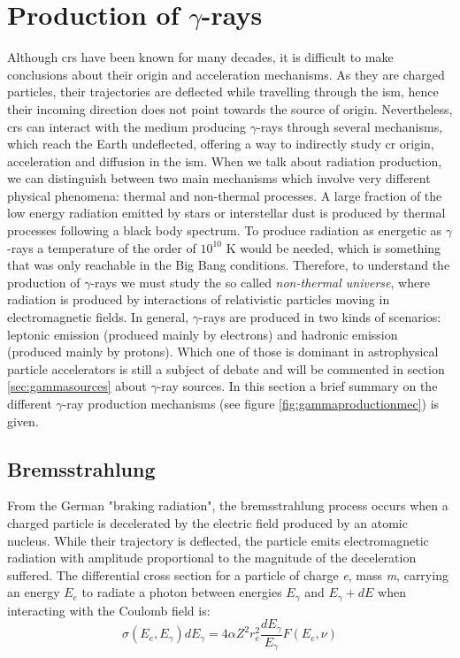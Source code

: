 \documentclass[main.tex]{subfiles}
\begin{document}
\section{Production of $\gamma$-rays}\label{sec:gammaproduction}

Although \glspl{cr} have been known for many decades, it is difficult to make conclusions about their origin and acceleration mechanisms. As they are charged particles, their trajectories are deflected while travelling through the \gls{ism}, hence their incoming direction does not point towards the source of origin. Nevertheless, \glspl{cr} can interact with the medium producing $\gamma$-rays through several mechanisms, which reach the Earth undeflected, offering a way to indirectly study \gls{cr} origin, acceleration and diffusion in the \gls{ism}.  
When we talk about radiation production, we can distinguish between two main mechanisms which involve very different physical phenomena: thermal and non-thermal processes. A large fraction of the low energy radiation emitted by stars or interstellar dust is produced by thermal processes following a black body spectrum. To produce radiation as energetic as $\gamma$-rays a temperature of the order of $10^{10}$ K would be needed, which is something that was only reachable in the Big Bang conditions. Therefore, to understand the production of $\gamma$-rays we must study the so called \textit{non-thermal universe}, where radiation is produced by interactions of relativistic particles moving in electromagnetic fields.
In general, $\gamma$-rays are produced in two kinds of scenarios: leptonic emission (produced mainly by electrons) and hadronic emission (produced mainly by protons). Which one of those is dominant in astrophysical particle accelerators is still a subject of debate and will be commented in section \ref{sec:gammasources} about $\gamma$-ray sources.
In this section a brief summary on the different $\gamma$-ray production mechanisms (see figure \ref{fig:gammaproductionmec}) is given.

\subsection{Bremsstrahlung}

From the German "braking radiation", the bremsstrahlung process occurs when a charged particle is decelerated by the electric field produced by an atomic nucleus. While their trajectory is deflected, the particle emits electromagnetic radiation with amplitude proportional to the magnitude of the deceleration suffered. The differential cross section for a particle of charge \textit{e}, mass \textit{m}, carrying an energy $E_{e}$ to radiate a photon between energies $E_{\gamma}$ and $E_{\gamma}+dE$ when interacting with the Coulomb field is:
\begin{equation} \label{eq:crosssectionbrems}
    \sigma(E_{e},E_{\gamma})dE_{\gamma} = 4\alpha Z^2r^{2}_{e}\frac{dE_{\gamma}}{E_{\gamma}}F(E_{e}, \nu)
\end{equation}
\end{document}
